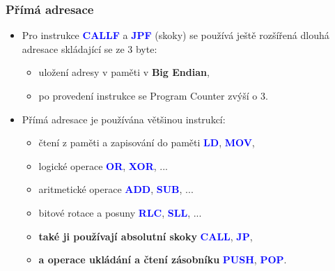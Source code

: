 	\begin{frame}
    \frametitle{Přímá adresace}
		
		\begin{itemize}
			\item Pro instrukce \textcolor{blue}{\textbf{CALLF}} a \textcolor{blue}{\textbf{JPF}} (skoky) se používá ještě rozšířená dlouhá adresace skládající se ze 3 byte:
			
			\begin{itemize}
				\item uložení adresy v paměti v \textbf{Big Endian},
				\item po provedení instrukce se Program Counter zvýší o 3.
			\end{itemize}
			
			\vspace{3mm}
			\item Přímá adresace je používána většinou instrukcí:
			
			\begin{itemize}
				\item čtení z paměti a zapisování do paměti \textcolor{blue}{\textbf{LD}}, \textcolor{blue}{\textbf{MOV}},
				\item logické operace \textcolor{blue}{\textbf{OR}}, \textcolor{blue}{\textbf{XOR}}, ...
				\item aritmetické operace \textcolor{blue}{\textbf{ADD}}, \textcolor{blue}{\textbf{SUB}}, ...
				\item bitové rotace a posuny \textcolor{blue}{\textbf{RLC}}, \textcolor{blue}{\textbf{SLL}}, ...
				\item \textbf{také ji používají absolutní skoky} \textcolor{blue}{\textbf{CALL}}, \textcolor{blue}{\textbf{JP}},
				\item \textbf{a operace ukládání a čtení zásobníku} \textcolor{blue}{\textbf{PUSH}}, \textcolor{blue}{\textbf{POP}}.
			\end{itemize}
			
		\end{itemize}
		
	\end{frame}
	
